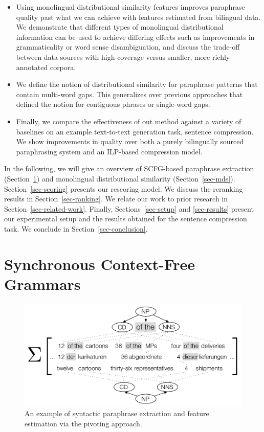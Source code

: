 \documentclass[11pt]{article}
\begin{document}
\begin{itemize}

\item Using monolingual distributional similarity features improves
  paraphrase quality past what we can achieve with features estimated
  from bilingual data. We demonstrate that different types of
  monolingual distributional information can be used to achieve
  differing effects such as improvements in grammaticality or word
  sense disambiguation, and discuss the trade-off between data sources
  with high-coverage versus smaller, more richly annotated corpora.

\item We define the notion of distributional similarity for paraphrase
  patterns that contain multi-word gaps. This generalizes over
  previous approaches that defined the notion for contiguous phrases
  or single-word gaps.

\item Finally, we compare the effectiveness of out method against a
  variety of baselines on an example text-to-text generation task,
  sentence compression. We show improvements in quality over both a
  purely bilingually sourced paraphrasing system and an ILP-based
  compression model.
\end{itemize}

In the following, we will give an overview of SCFG-based paraphrase
extraction (Section~\ref{sec-scfgs}) and monolingual distributional
similarity (Section~\ref{sec-mds}). Section~\ref{sec-scoring} presents
our rescoring model. We discuss the reranking results in
Section~\ref{sec-ranking}. We relate our work to prior research in
Section~\ref{sec-related-work}. Finally, Sections~\ref{sec-setup} and
\ref{sec-results} present our experimental setup and the results
obtained for the sentence compression task. We conclude in
Section~\ref{sec-conclusion}.

\section{Synchronous Context-Free Grammars}
\label{sec-scfgs}

\begin{figure}[!t]
\begin{center}
\includegraphics[width=0.99\linewidth]{figures/syntactic_pivoting.pdf}
\end{center}
\caption{An example of syntactic paraphrase extraction and feature
  estimation via the pivoting approach.}\label{fig-syntactic-pivoting}
\end{figure}
\end{document}
